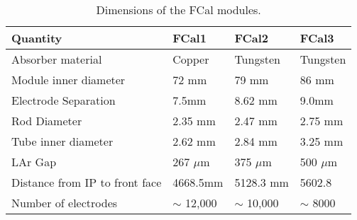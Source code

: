 %
%


%
%
%
%
\begin{table}[tb]
\begin{center}
\begin{tabular}{|l|l|l|l||}
\hline
Quantity & FCal1 & FCal2 & FCal3 \\
\hline
\hline
Absorber material & Copper & Tungsten & Tungsten\\
\hline
Module inner diameter & 72 mm & 79 mm & 86 mm\\
\hline
Electrode Separation & 7.5mm & 8.62 mm &9.0mm \\
\hline
Rod Diameter & 2.35 mm & 2.47 mm & 2.75 mm\\
\hline
Tube inner diameter & 2.62 mm & 2.84 mm & 3.25 mm \\
\hline 
LAr Gap & 267 $\mu$m & 375 $\mu$m & 500 $\mu$m \\
\hline
Distance from IP to front face & 4668.5mm & 5128.3 mm & 5602.8 \\
\hline
Number of electrodes & $\sim$ 12,000 & $\sim$ 10,000 & $\sim$ 8000 \\
\hline
\end{tabular}
\end{center}
\caption{Dimensions of the FCal modules.}
\end{table}

